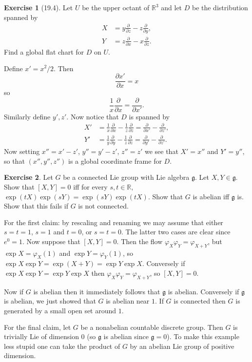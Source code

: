 \documentclass[10pt]{article}
\newcommand{\RR}{\mathbb{R}}
\theoremstyle{definition}
\newtheorem{exer}{Exercise}
\begin{document}
\begin{exer}[19.4]
Let $U$ be the upper octant of $\RR^3$ and let $D$ be the distribution spanned by
\begin{align*}
X &= y\frac{\partial}{\partial z} - z\frac{\partial}{\partial y},\\
Y &= z\frac{\partial}{\partial x} - x\frac{\partial}{\partial z}.
\end{align*}
Find a global flat chart for $D$ on $U$.
\end{exer}

Define $x' = x^2/2$. Then
$$\frac{\partial x'}{\partial x} = x$$
so
$$\frac{1}{x} \frac{\partial}{\partial x} = \frac{\partial}{\partial x'}.$$
Similarly define $y',z'$. Now notice that $D$ is spanned by
\begin{align*}
X' &= \frac{1}{x} \frac{\partial}{\partial x} - \frac{1}{z}\frac{\partial}{\partial z} = \frac{\partial}{\partial x'} - \frac{\partial}{\partial z'},\\
Y' &= \frac{1}{y} \frac{\partial}{\partial y} - \frac{1}{z} \frac{\partial}{\partial z} = \frac{\partial}{\partial y'} - \frac{\partial}{\partial z'}.
\end{align*}
Now setting $x'' = x' - z'$, $y'' = y' - z'$, $z'' = z'$ we see that $X' = x''$ and $Y' = y''$, so that $(x'', y'', z'')$ is a global coordinate frame for $D$.

\begin{exer}
Let $G$ be a connected Lie group with Lie algebra $\mathfrak g$.
Let $X, Y \in \mathfrak g$.
Show that $[X, Y] = 0$ iff for every $s, t \in \RR$, $\exp(tX)\exp(sY) = \exp(sY)\exp(tX)$.
Show that $G$ is abelian iff $\mathfrak g$ is.
Show that this fails if $G$ is not connected.
\end{exer}

For the first claim: by rescaling and renaming we may assume that either $s = t = 1$, $s = 1$ and $t = 0$, or $s = t = 0$.
The latter two cases are clear since $e^0 = 1$.
Now suppose that $[X, Y] = 0$. Then the flow $\varphi_X\varphi_Y = \varphi_{X + Y}$, but $\exp X = \varphi_X(1)$ and $\exp Y = \varphi_Y(1)$, so $\exp X \exp Y = \exp(X + Y) = \exp Y \exp X$.
Conversely if $\exp X \exp Y = \exp Y \exp X$ then $\varphi_X\varphi_Y = \varphi_{X + Y}$, so $[X, Y] = 0$.

Now if $G$ is abelian then it immediately follows that $\mathfrak g$ is abelian.
Conversely if $\mathfrak g$ is abelian, we just showed that $G$ is abelian near $1$.
If $G$ is connected then $G$ is generated by a small open set around $1$.

For the final claim, let $G$ be a nonabelian countable discrete group. Then $G$ is trivially Lie of dimension $0$ (so $\mathfrak g$ is abelian since $\mathfrak g = 0$).
To make this example less stupid one can take the product of $G$ by an abelian Lie group of positive dimension.
\end{document}
